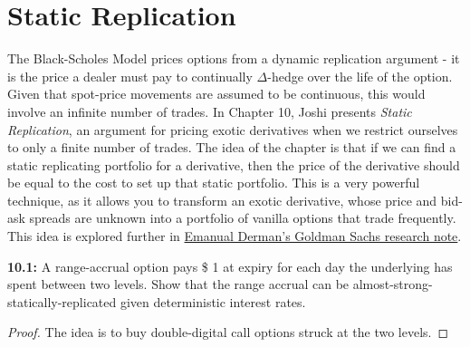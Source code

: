 \newpage
\section{Static Replication}
The Black-Scholes Model prices options from a dynamic replication argument - it is the price a dealer must pay to continually $\Delta$-hedge over the life of the option. Given that spot-price movements are assumed to be continuous, this would involve an infinite number of trades. 
In Chapter 10, Joshi presents \textit{Static Replication}, an argument for pricing exotic derivatives when we restrict ourselves to only a finite number of trades. The idea of the chapter is that if we can find a static replicating portfolio for a derivative, then the price of the derivative should be equal to the cost to set up that static portfolio.
This is a very powerful technique, as it allows you to transform an exotic derivative, whose price and bid-ask spreads are unknown into a portfolio of vanilla options that trade frequently. This idea is explored further in \href{https://emanuelderman.com/wp-content/uploads/1994/04/static_options_replication.pdf}{Emanual Derman's Goldman Sachs research note}.

\begin{tcolorbox}[colframe=black,colback=gray!5,boxrule=0.5pt]
\textbf{10.1:} A range-accrual option pays \$ 1 at expiry for each day the underlying has spent between two levels. Show that the range accrual can be almost-strong-statically-replicated given deterministic interest rates.
\end{tcolorbox}
\begin{proof}
    The idea is to buy double-digital call options struck at the two levels. 
\end{proof}